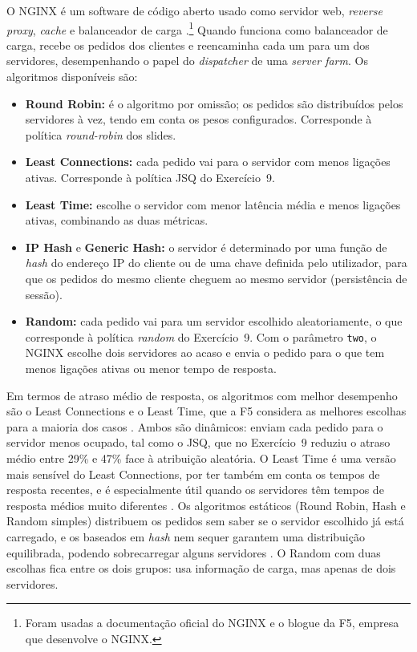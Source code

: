 \documentclass[10pt,a4paper]{article}
\begin{document}
O NGINX é um software de código aberto usado como servidor web, \textit{reverse proxy}, \textit{cache} e balanceador de carga \cite{f5nginx}.\footnote{Foram usadas a documentação oficial do NGINX e o blogue da F5, empresa que desenvolve o NGINX.} Quando funciona como balanceador de carga, recebe os pedidos dos clientes e reencaminha cada um para um dos servidores, desempenhando o papel do \textit{dispatcher} de uma \textit{server farm}. Os algoritmos disponíveis \cite{nginxdocs} são:
\begin{itemize}
  \item \textbf{Round Robin:} é o algoritmo por omissão; os pedidos são distribuídos pelos servidores à vez, tendo em conta os pesos configurados. Corresponde à política \textit{round-robin} dos slides.
  \item \textbf{Least Connections:} cada pedido vai para o servidor com menos ligações ativas. Corresponde à política JSQ do Exercício~9.
  \item \textbf{Least Time:} escolhe o servidor com menor latência média e menos ligações ativas, combinando as duas métricas.
  \item \textbf{IP Hash} e \textbf{Generic Hash:} o servidor é determinado por uma função de \textit{hash} do endereço IP do cliente ou de uma chave definida pelo utilizador, para que os pedidos do mesmo cliente cheguem ao mesmo servidor (persistência de sessão).
  \item \textbf{Random:} cada pedido vai para um servidor escolhido aleatoriamente, o que corresponde à política \textit{random} do Exercício~9. Com o parâmetro \texttt{two}, o NGINX escolhe dois servidores ao acaso e envia o pedido para o que tem menos ligações ativas ou menor tempo de resposta.
\end{itemize}

Em termos de atraso médio de resposta, os algoritmos com melhor desempenho são o Least Connections e o Least Time, que a F5 considera as melhores escolhas para a maioria dos casos \cite{f5lb}. Ambos são dinâmicos: enviam cada pedido para o servidor menos ocupado, tal como o JSQ, que no Exercício~9 reduziu o atraso médio entre 29\% e 47\% face à atribuição aleatória. O Least Time é uma versão mais sensível do Least Connections, por ter também em conta os tempos de resposta recentes, e é especialmente útil quando os servidores têm tempos de resposta médios muito diferentes \cite{f5lb}. Os algoritmos estáticos (Round Robin, Hash e Random simples) distribuem os pedidos sem saber se o servidor escolhido já está carregado, e os baseados em \textit{hash} nem sequer garantem uma distribuição equilibrada, podendo sobrecarregar alguns servidores \cite{f5lb}. O Random com duas escolhas fica entre os dois grupos: usa informação de carga, mas apenas de dois servidores.
\end{document}
